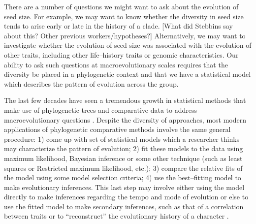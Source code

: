 \documentclass[12pt]{article}
\begin{document}
There are a number of questions we might want to ask about the evolution of seed size. For example, we may want to know whether the diversity in seed size tends to arise early or late in the history of a clade. [What did Stebbins say about this? Other previous workers/hypotheses?] Alternatively, we may want to investigate whether the evolution of seed size was associated with the evolution of other traits, including other life--history traits or genomic characteristics. Our ability to ask such questions at macroevolutionary scales requires that the diversity be placed in a phylogenetic context and that we have a statistical model which describes the pattern of evolution across the group. 

The last few decades have seen a tremendous growth in statistical methods that make use of phylogenetic trees and comparative data to address macroevolutionary questions \citep[for recent reviews, see][]{Omeara2012, PennellHarmon}. Despite the diversity of approaches, most modern applications of phylogenetic comparative methods involve the same general procedure: 1) come up with set of statistical models which a researcher thinks may characterize the pattern of evolution; 2) fit these models to the data using maximum likelihood, Bayesian inference or some other technique (such as least squares or Restricted maximum likelihood, etc.); 3) compare the relative fits of the model using some model selection criteria; 4) use the best--fitting model to make evolutionary inferences. This last step may involve either using the model directly to make inferences regarding the tempo and mode of evolution \citep[e.g.][]{HansenMartins1996, Mooers1999, Harmon2010, Hunt2012} or else to use the fitted model to make secondary inferences, such as that of a correlation between traits \citep[e.g.][]{Felsenstein1985, Grafen1989, Freckleton2009} or to ``reconstruct'' the evolutionary history of a character \citep[e.g.][]{Schluter1997, Huelsenbeck2003}. 
\end{document}
